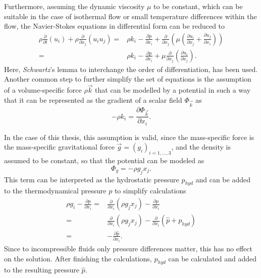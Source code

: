 Furthermore, assuming the dynamic viscosity \(\mu\) to be constant, which can be suitable in the case of isothermal flow or small temperature differences within the flow, the Navier-Stokes equations in differential form can be reduced to 
\begin{subequations}
\label{eq:navierstokes}
\begin{align}
  \rho \frac{\partial}{\partial t}   \left(u_i \right)
  + \rho \frac{\partial}{\partial x_j} \left( u_i  u_j \right) 
  =& \rho k_i
  - \frac{\partial p}{\partial x_i}
+ \frac{\partial}{\partial x_j} \left( \mu  \left( \frac{\partial u_i}{\partial x_j} 
+ \frac{\partial u_j}{\partial x_i} \right) \right) \\[0.5em]
  =& \rho k_i
  - \frac{\partial p}{\partial x_i}
  + \mu \frac{\partial}{\partial x_j} \left( \frac{\partial u_i}{\partial x_j} \right).
\end{align}
\end{subequations}
Here, \emph{Schwartz}'s lemma to interchange the order of differentiation, has been used. Another common step to further simplify the set of equations is the assumption of a volume-specific force \(\rho \vec{k}\) that can be modelled by a potential in such a way that it can be represented as the gradient of a scalar field \(\Phi_\vec{k}\) as
\begin{displaymath}
 - \rho k_i = \frac{\partial \Phi_\vec{k}}{\partial x_i}.
\end{displaymath}

In the case of this thesis, this assumption is valid, since the mass-specific force is the mass-specific gravitational force \(\vec{g} = \left( g_i \right)_{i = 1,\dots,3}\), and the density is assumed to be constant, so that the potential can be modeled as
\begin{displaymath}
  \Phi_g = - \rho g_j x_j.
\end{displaymath}
This term can be interpreted as the hydrostatic pressure \(p_{hyd}\) and can be added to the thermodynamical pressure \(p\) to simplify calculations 
\begin{align*}
  \rho g_i - \frac{\partial p}{\partial x_i} 
  =& \frac{\partial}{\partial x_i} \left( \rho g_j x_j \right) - \frac{\partial p}{\partial x_i} \nonumber \\[0.5em]
  =& \frac{\partial}{\partial x_i} \left( \rho g_j x_j \right) - \frac{\partial}{\partial x_i}  \left(\hat{p} + p_{hyd} \right) \nonumber \\[0.5em]
  =& - \frac{\partial \hat{p}}{\partial x_i}.
\end{align*}
Since to incompressible fluids only pressure differences matter, this has no effect on the solution. After finishing the calculations, \(p_{hyd}\) can be calculated and added to the resulting pressure \(\hat{p}\).

